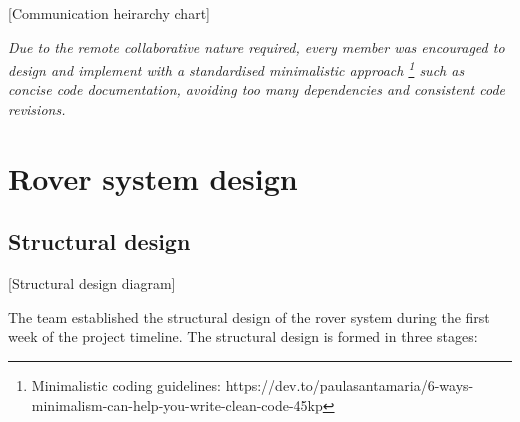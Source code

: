 \documentclass[11pt, a4paper]{article}
\begin{document}
\begin{center}
    [Communication heirarchy chart]
\end{center}

\textit{Due to the remote collaborative nature required, every member was encouraged to design and implement with a standardised minimalistic approach \footnote{Minimalistic coding guidelines: https://dev.to/paulasantamaria/6-ways-minimalism-can-help-you-write-clean-code-45kp} such as concise code documentation, avoiding too many dependencies and consistent code revisions. }
 




\vfill






\pagebreak
\section{Rover system design}

\subsection{Structural design}

\begin{center}
    [Structural design diagram]
\end{center}

The team established the structural design of the rover system during the first week of the project timeline. The structural design is formed in three stages: 
\end{document}
